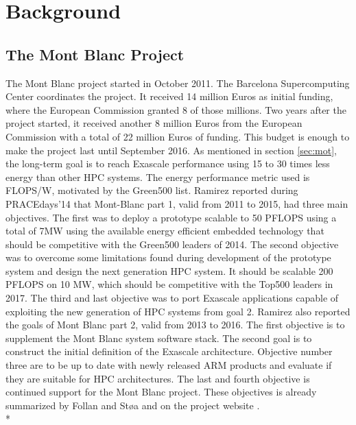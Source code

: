 \chapter{Background}
\label{ch:background}

\section{The Mont Blanc Project}
The Mont Blanc project \cite{m:MB} started in October 2011. The Barcelona Supercomputing Center coordinates the project. It received 14 million Euros as initial funding, where the European Commission granted 8 of those millions. Two years after the project started, it received another 8 million Euros from the European Commission with a total of 22 million Euros of funding. This budget is enough to make the project last until September 2016. As mentioned in section \ref{sec:mot}, the long-term goal is to reach Exascale performance using 15 to 30 times less energy than other HPC systems. The energy performance metric used is FLOPS/W, motivated by the Green500 list. Ramirez reported during PRACEdays'14 \cite{m:MB-PRACE-14} that Mont-Blanc part 1, valid from 2011 to 2015, had three main objectives. The first was to deploy a prototype scalable to 50 PFLOPS using a total of 7MW using the available energy efficient embedded technology that should be competitive with the Green500 leaders of 2014. The second objective was to overcome some limitations found during development of the prototype system and design the next generation HPC system. It should be scalable 200 PFLOPS on 10 MW, which should be competitive with the Top500 leaders in 2017. The third and last objective was to port Exascale applications capable of exploiting the new generation of HPC systems from goal 2. Ramirez also reported the goals of Mont Blanc part 2, valid from 2013 to 2016. The first objective is to supplement the Mont Blanc system software stack. The second goal is to construct the initial definition of the Exascale architecture. Objective number three are to be up to date with newly released ARM products and evaluate if they are suitable for HPC architectures. The last and fourth objective is continued support for the Mont Blanc project. These objectives is already summarized by Follan and Støa \cite{mt:T&S} and on the project website \cite{m:MB}.\\*

